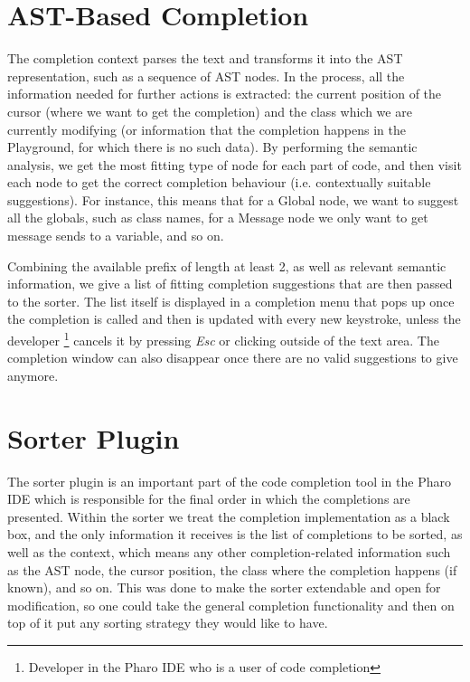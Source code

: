 \section{AST-Based Completion}
\label{sec:PharoCompletion-ASTCompletion}
The completion context parses the text and transforms it into the AST representation, such as a sequence of AST nodes. In the process, all the information needed for further actions is extracted: the current position of the cursor (where we want to get the completion) and the class which we are currently modifying (or information that the completion happens in the Playground, for which there is no such data). By performing the semantic analysis, we get the most fitting type of node for each part of code, and then visit each node to get the correct completion behaviour (i.e. contextually suitable suggestions). For instance, this means that for a Global node, we want to suggest all the globals, such as class names, for a Message node we only want to get message sends to a variable, and so on.

Combining the available prefix of length at least 2, as well as relevant semantic information, we give a list of fitting completion suggestions that are then passed to the sorter. The list itself is displayed in a completion menu that pops up once the completion is called and then is updated with every new keystroke, unless the developer \footnote{Developer in the Pharo IDE who is a user of code completion} cancels it by pressing \textit{Esc} or clicking outside of the text area. The completion window can also disappear once there are no valid suggestions to give anymore.

\section{Sorter Plugin}
\label{sec:PharoCompletion-SorterPlugin}
The sorter plugin is an important part of the code completion tool in the Pharo IDE which is responsible for the final order in which the completions are presented. Within the sorter we treat the completion implementation as a black box, and the only information it receives is the list of completions to be sorted, as well as the context, which means any other completion-related information such as the AST node, the cursor position, the class where the completion happens (if known), and so on. This was done to make the sorter extendable and open for modification, so one could take the general completion functionality and then on top of it put any sorting strategy they would like to have.

